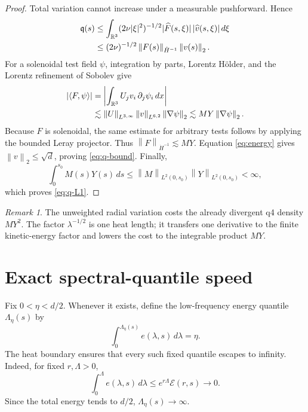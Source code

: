 \documentclass[11pt]{article}
\theoremstyle{remark}
\newtheorem{remark}[theorem]{Remark}
\newcommand{\R}{\mathbb R}
\newcommand{\norm}[1]{\left\|#1\right\|}
\newcommand{\abs}[1]{\left|#1\right|}
\newcommand{\ip}[2]{\left\langle #1,#2\right\rangle}
\begin{document}
\begin{proof}
Total variation cannot increase under a measurable pushforward.  Hence
\begin{align}
 \mathfrak q(s)
 &\le
 \int_{\R^3}
 (2\nu|\xi|^2)^{-1/2}
 |\widehat F(s,\xi)|\,|\widehat v(s,\xi)|\,d\xi \notag\\
 &\le
 (2\nu)^{-1/2}
 \norm{F(s)}_{\dot H^{-1}}\norm{v(s)}_2.
\label{eq:pushforward-CS}
\end{align}
For a solenoidal test field \(\psi\), integration by parts, Lorentz
Hölder, and the Lorentz refinement of Sobolev give
\begin{align}
 \abs{\ip{F}{\psi}}
 &=
 \abs{\int_{\R^3}U_jv_i\,\partial_j\psi_i\,dx}\notag\\
 &\lesssim
 \norm U_{L^{3,\infty}}
 \norm v_{L^{6,2}}
 \norm{\nabla\psi}_2
 \lesssim
 MY\norm{\nabla\psi}_2.
\label{eq:Hminus}
\end{align}
Because \(F\) is solenoidal, the same estimate for arbitrary tests
follows by applying the bounded Leray projector.  Thus
\(\norm F_{\dot H^{-1}}\lesssim MY\).  Equation
\eqref{eq:energy} gives \(\norm v_2\le\sqrt d\), proving
\eqref{eq:q-bound}.  Finally,
\[
 \int_0^{s_0}M(s)Y(s)\,ds
 \le
 \norm M_{L^2(0,s_0)}\norm Y_{L^2(0,s_0)}<\infty,
\]
which proves \eqref{eq:q-L1}.
\end{proof}

\begin{remark}
The unweighted radial variation costs the already divergent q4 density
\(MY^2\).  The factor \(\lambda^{-1/2}\) is one heat length; it transfers
one derivative to the finite kinetic-energy factor and lowers the cost
to the integrable product \(MY\).
\end{remark}

\section{Exact spectral-quantile speed}

Fix \(0<\eta<d/2\).  Whenever it exists, define the low-frequency
energy quantile \(\Lambda_\eta(s)\) by
\begin{equation}
\label{eq:quantile}
 \int_0^{\Lambda_\eta(s)}e(\lambda,s)\,d\lambda=\eta.
\end{equation}
The heat boundary ensures that every such fixed quantile escapes to
infinity.  Indeed, for fixed \(r,\Lambda>0\),
\begin{equation}
\label{eq:low-frequency}
 \int_0^\Lambda e(\lambda,s)\,d\lambda
 \le e^{r\Lambda}\mathcal E(r,s)\longrightarrow0.
\end{equation}
Since the total energy tends to \(d/2\), \(\Lambda_\eta(s)\to\infty\).
\end{document}
